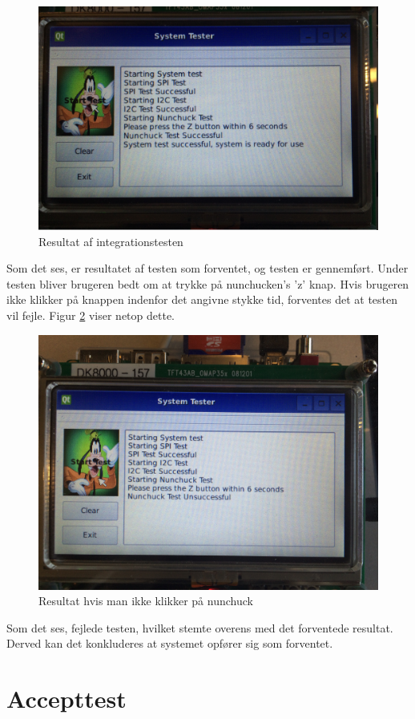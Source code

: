 \begin{figure}[H]
	\centering
	\includegraphics[width=\textwidth]{Test/images/IntegrationstestProtokoller/resultat2}
	\caption{Resultat af integrationstesten}
	\label{figure:integrationstestresult}
\end{figure}

Som det ses, er resultatet af testen som forventet, og testen er gennemført. Under testen bliver brugeren bedt om at trykke på nunchucken's 'z' knap. Hvis brugeren ikke klikker på knappen indenfor det angivne stykke tid, forventes det at testen vil fejle. Figur \ref{figure:integrationstestresult1} viser netop dette.


\begin{figure}[H]
	\centering
	\includegraphics[width=\textwidth]{Test/images/IntegrationstestProtokoller/resultat1}
	\caption{Resultat hvis man ikke klikker på nunchuck}
	\label{figure:integrationstestresult1}
\end{figure}

Som det ses, fejlede testen, hvilket stemte overens med det forventede resultat. Derved kan det konkluderes at systemet opfører sig som forventet.

\section{Accepttest}